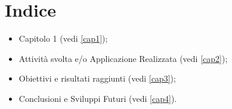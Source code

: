 \thispagestyle{headings}

\chapter*{Indice} \label{cap0}
\begin{itemize}
    \item Capitolo 1 (vedi \ref{cap1});
    \item Attività svolta e/o Applicazione Realizzata (vedi \ref{cap2});
    \item Obiettivi e risultati raggiunti (vedi \ref{cap3});
    \item Conclusioni e Sviluppi Futuri (vedi \ref{cap4}).    
\end{itemize}
